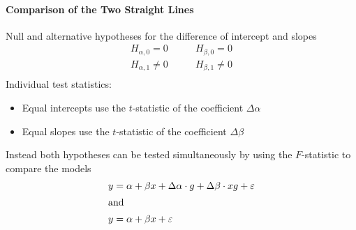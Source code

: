\documentclass[11pt]{article}
\theoremstyle{definition}
\begin{document}
\paragraph{Comparison of the Two Straight Lines} Null and alternative hypotheses for the difference of intercept and slopes
\begin{align*}
	H_{\alpha,0} = 0 &\qquad H_{\beta,0} = 0\\
	H_{\alpha,1} \neq 0 &\qquad H_{\beta,1} \neq 0\\
\end{align*}
Individual test statistics:
\begin{itemize}[nosep]
	\item Equal intercepts use the $t$-statistic of the coefficient $\Delta\alpha$
	\item Equal slopes use the $t$-statistic of the coefficient $\Delta\beta$
\end{itemize}
Instead both hypotheses can be tested simultaneously by using the $F$-statistic to compare the models
\begin{align}
	y &= \alpha + \beta x + \Delta\alpha\cdot g + \Delta\beta\cdot x g + \varepsilon\\
	\intertext{and}
	y &= \alpha + \beta x + \varepsilon
\end{align}
\end{document}
